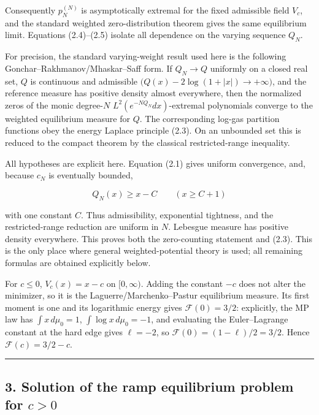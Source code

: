 \documentclass[11pt]{article}
\theoremstyle{keio}
\theoremstyle{definition}
\theoremstyle{remark}
\begin{document}
Consequently \(p_N^{(N)}\) is asymptotically extremal for the fixed
admissible field \(V_c\), and the standard weighted zero-distribution
theorem gives the same equilibrium limit. Equations (2.4)--(2.5) isolate
all dependence on the varying sequence \(Q_N\).

For precision, the standard varying-weight result used here is the following
Gonchar--Rakhmanov/Mhaskar--Saff form. If \(Q_N\to Q\) uniformly on a closed
real set, \(Q\) is continuous and admissible
\(\bigl(Q(x)-2\log(1+|x|)\to+\infty\bigr)\), and the reference measure has
positive density almost everywhere, then the normalized zeros of the monic
degree-\(N\) \(L^2(e^{-NQ_N}dx)\)-extremal polynomials converge to the
weighted equilibrium measure for \(Q\). The corresponding log-gas partition
functions obey the energy Laplace principle (2.3). On an unbounded set this
is reduced to the compact theorem by the classical restricted-range
inequality.

All hypotheses are explicit here. Equation (2.1) gives uniform convergence,
and, because \(c_N\) is eventually bounded,

\[
Q_N(x)\ge x-C\qquad(x\ge C+1)
\]

with one constant \(C\). Thus admissibility, exponential tightness, and the
restricted-range reduction are uniform in \(N\). Lebesgue measure has
positive density everywhere. This proves both the zero-counting statement
and (2.3). This is the only place where general weighted-potential theory is
used; all remaining formulas are obtained explicitly below.

For \(c\le0\), \(V_c(x)=x-c\) on \([0,\infty)\). Adding the constant \(-c\)
does not alter the minimizer, so it is the Laguerre/Marchenko--Pastur
equilibrium measure. Its first moment is one and its logarithmic energy gives
\(\mathcal F(0)=3/2\): explicitly, the MP law has
\(\int x\,d\mu_0=1\), \(\int\log x\,d\mu_0=-1\), and evaluating the
Euler--Lagrange constant at the hard edge gives \(\ell=-2\), so
\(\mathcal F(0)=(1-\ell)/2=3/2\). Hence
\(\mathcal F(c)=3/2-c\).

\begin{center}\rule{0.5\linewidth}{0.5pt}\end{center}

\subsection{\texorpdfstring{3. Solution of the ramp equilibrium problem for \(c>0\)}{3. Solution of the ramp equilibrium problem for c\textgreater0}}
\end{document}
